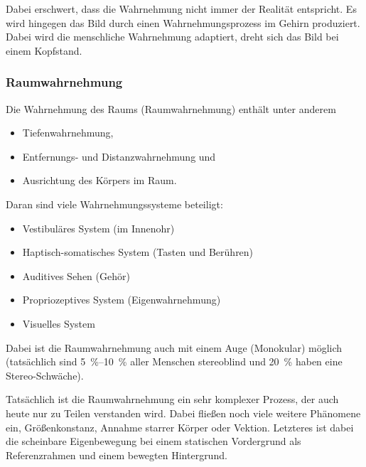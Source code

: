 			Dabei erschwert, dass die Wahrnehmung nicht immer der Realität entspricht. Es wird hingegen das Bild durch einen Wahrnehmungsprozess im Gehirn produziert. Dabei wird die menschliche Wahrnehmung adaptiert, \bspw dreht sich das Bild bei einem Kopfstand.

			\subsubsection{Raumwahrnehmung}
				Die Wahrnehmung des Raums (Raumwahrnehmung) enthält unter anderem
				\begin{itemize}
					\item Tiefenwahrnehmung,
					\item Entfernungs- und Distanzwahrnehmung und
					\item Ausrichtung des Körpers im Raum.
				\end{itemize}
				Daran sind viele Wahrnehmungssysteme beteiligt:
				\begin{itemize}
					\item Vestibuläres System (im Innenohr)
					\item Haptisch-somatisches System (Tasten und Berühren)
					\item Auditives Sehen (Gehör)
					\item Propriozeptives System (Eigenwahrnehmung)
					\item Visuelles System
				\end{itemize}
			
				Dabei ist die Raumwahrnehmung auch mit einem Auge (Monokular) möglich (tatsächlich sind \SIrange{5}{10}{\percent} aller Menschen stereoblind und \SI{20}{\percent} haben eine Stereo-Schwäche).
				
				Tatsächlich ist die Raumwahrnehmung ein sehr komplexer Prozess, der auch heute nur zu Teilen verstanden wird. Dabei fließen noch viele weitere Phänomene ein, \zB Größenkonstanz, Annahme starrer Körper oder Vektion. Letzteres ist dabei die scheinbare Eigenbewegung bei einem statischen Vordergrund als Referenzrahmen und einem bewegten Hintergrund.


